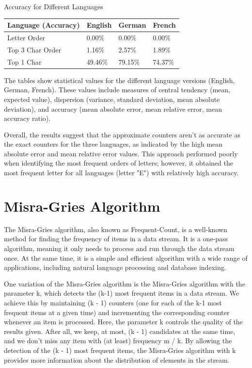 \documentclass[]{revdetua}
\begin{document}
\begin{table}[!ht]
    \centering
    Accuracy for Different Languages
    \begin{tabular}{|l|l|l|l|}
    \hline
        Language (Accuracy) & English & German & French \\ \hline
        Letter Order & 0.00\% & 0.00\% & 0.00\% \\ \hline
        Top 3 Char Order & 1.16\% & 2.57\% & 1.89\% \\ \hline
        Top 1 Char & 49.46\% & 79.15\% & 74.37\% \\ \hline
    \end{tabular}
\end{table}

\pagebreak

The tables show statistical values for the different language versions (English, German, French). These values include measures of central tendency (mean, expected value), dispersion (variance, standard deviation, mean absolute deviation), and accuracy (mean absolute error, mean relative error, mean accuracy ratio).

Overall, the results suggest that the approximate counters aren't as accurate as the exact counters for the three languages, as indicated by the high mean absolute error and mean relative error values. This approach performed poorly when identifying the most frequent orders of letters; however, it obtained the most frequent letter for all languages (letter "E") with relatively high accuracy.

\section{Misra-Gries Algorithm}

The Misra-Gries algorithm, also known as Frequent-Count, is a well-known method for finding the frequency of items in a data stream. It is a one-pass algorithm, meaning it only needs to process and run through the data stream once. At the same time, it is a simple and efficient algorithm with a wide range of applications, including natural language processing and database indexing.

One variation of the Misra-Gries algorithm is the Misra-Gries algorithm with the parameter k, which detects the (k-1) most frequent items in a data stream. We achieve this by maintaining (k - 1) counters (one for each of the k-1 most frequent items at a given time) and incrementing the corresponding counter whenever an item is processed. Here, the parameter k controls the quality of the results given. After all, we keep, at most, (k - 1) candidates at the same time, and we don't miss any item with (at least) frequency m / k. By allowing the detection of the (k - 1) most frequent items, the Misra-Gries algorithm with k provides more information about the distribution of elements in the stream.
\end{document}
